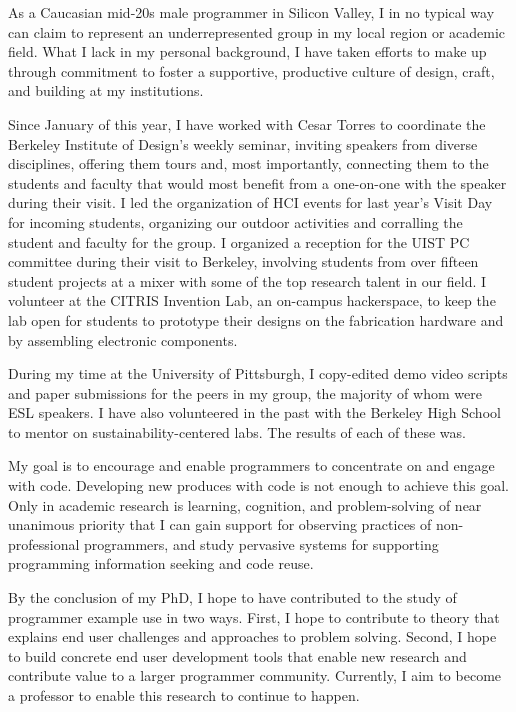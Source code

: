\documentclass[12pt]{memoir}
\begin{document}

As a Caucasian mid-20s male programmer in Silicon Valley, I in no typical way can claim to represent an underrepresented group in my local region or academic field.
What I lack in my personal background, I have taken efforts to make up through commitment to foster a supportive, productive culture of design, craft, and building at my institutions.

Since January of this year, I have worked with Cesar Torres to coordinate the Berkeley Institute of Design's weekly seminar, inviting speakers from diverse disciplines, offering them tours and, most importantly, connecting them to the students and faculty that would most benefit from a one-on-one with the speaker during their visit.
I led the organization of HCI events for last year's Visit Day for incoming students, organizing our outdoor activities and corralling the student and faculty for the group.
I organized a reception for the UIST PC committee during their visit to Berkeley, involving students from over fifteen student projects at a mixer with some of the top research talent in our field.
I volunteer at the CITRIS Invention Lab, an on-campus hackerspace, to keep the lab open for students to prototype their designs on the fabrication hardware and by assembling electronic components.

During my time at the University of Pittsburgh, I copy-edited demo video scripts and paper submissions for the peers in my group, the majority of whom were ESL speakers.
I have also volunteered in the past with the Berkeley High School to mentor on sustainability-centered labs.
The results of each of these was.

\fi


My goal is to encourage and enable programmers to concentrate on and engage with code.
Developing new produces with code is not enough to achieve this goal.
Only in academic research is learning, cognition, and problem-solving of near unanimous priority that I can gain support for observing practices of non-professional programmers, and study pervasive systems for supporting programming information seeking and code reuse.

By the conclusion of my PhD, I hope to have contributed to the study of programmer example use in two ways.
First, I hope to contribute to theory that explains end user challenges and approaches to problem solving.
Second, I hope to build concrete end user development tools that enable new research and contribute value to a larger programmer community.
Currently, I aim to become a professor to enable this research to continue to happen.
\end{document}
